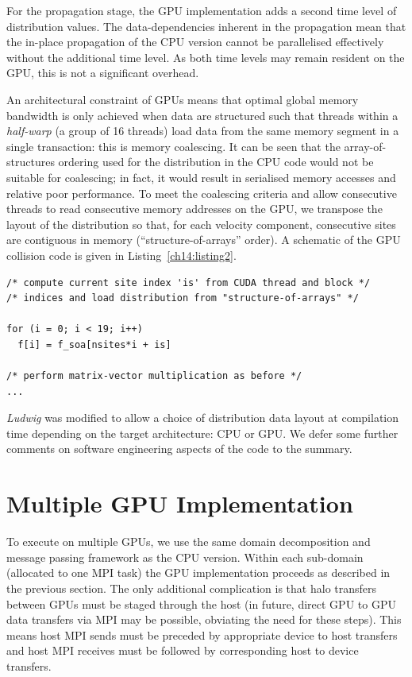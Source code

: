 For the propagation stage, the GPU implementation adds a second time
level of distribution values. The data-dependencies inherent in the
propagation mean that the in-place propagation of the CPU version
cannot be parallelised effectively without the additional time level.
As both time levels may remain resident on the GPU, this is not a
significant overhead.

An architectural
constraint of GPUs means that optimal global memory bandwidth
is only achieved when data are structured such that threads within a
{\it half-warp} (a group of 16 threads) load data from the same memory
segment in a single transaction: this is memory coalescing. It can be
seen that the array-of-structures ordering used for the distribution
in the CPU code would not be suitable for coalescing; in fact, it would
result in serialised memory accesses and relative poor performance.
To meet the coalescing criteria and allow consecutive threads to read
consecutive memory addresses on the GPU, we transpose the layout of the
distribution so that, for each velocity component, consecutive sites
are contiguous in memory (``structure-of-arrays'' order). A schematic of
the GPU collision code is given in Listing~\ref{ch14:listing2}.

\begin{lstlisting}[float, label=ch14:listing2,
caption = Collision schematic for GPU.]
/* compute current site index 'is' from CUDA thread and block */
/* indices and load distribution from "structure-of-arrays" */

for (i = 0; i < 19; i++)    
  f[i] = f_soa[nsites*i + is]

/* perform matrix-vector multiplication as before */
...
\end{lstlisting}


\textit{Ludwig} was modified to allow a choice of distribution data layout
at compilation time depending on the target architecture: CPU or GPU. We
defer some further comments on software engineering aspects of the code to
the summary.


\section{Multiple GPU Implementation}\label{ch14:sec:parallelgpu}   

To execute on multiple GPUs, we use the same domain decomposition
and message passing framework as the CPU version. Within each
sub-domain (allocated to one MPI task) the GPU implementation
proceeds as described in the previous section. The only additional
complication is that halo transfers between GPUs must be staged
through the host (in future, direct GPU to GPU data transfers via
MPI may be possible, obviating the need for these steps). This
means host MPI sends must be preceded by appropriate device to host
transfers and host MPI receives must be followed by corresponding host
to device transfers.

